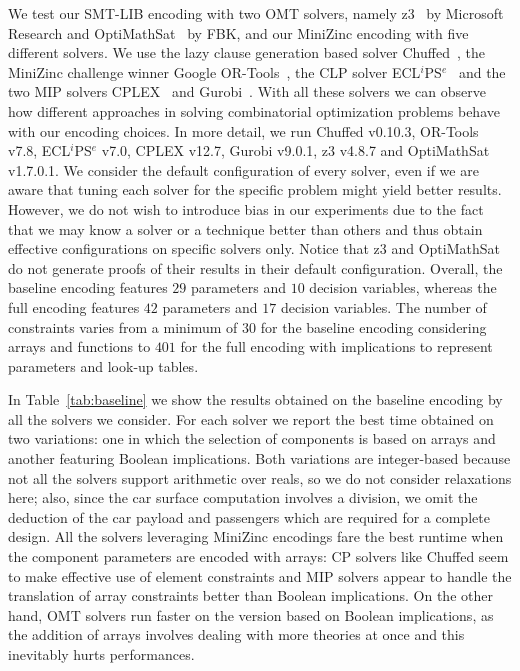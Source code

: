 %
We test our SMT-LIB encoding with two OMT solvers, namely z3~\cite{z3}
by Microsoft Research and OptiMathSat~\cite{sebastiani2018optimathsat}
by FBK, and our MiniZinc encoding with five different solvers. 
We use the lazy clause generation based solver 
Chuffed~\cite{chu2013improving}, the MiniZinc challenge winner Google
OR-Tools~\cite{ortools}, the CLP solver ECL$^i$PS$^e$~\cite{schimpf_shen_2012}
and the two MIP solvers CPLEX~\cite{cplex} and Gurobi~\cite{gurobi}.
With all these solvers we can observe how different approaches in solving
combinatorial optimization problems behave with our encoding 
choices. In more detail, we run Chuffed v0.10.3, OR-Tools v7.8, ECL$^i$PS$^e$ 
v7.0, CPLEX v12.7, Gurobi v9.0.1, z3 v4.8.7 and OptiMathSat v1.7.0.1.
We consider the default configuration of every solver, even 
if we are aware that tuning each solver for the specific problem might
yield better results. However, we do not wish to introduce bias in our
experiments due to the fact that we may know a solver or a technique
better than others and thus obtain effective configurations on
specific solvers only. Notice that z3 and OptiMathSat do not generate 
proofs of their results in their default configuration. Overall, the
baseline encoding features $29$ parameters and $10$ decision variables, 
whereas the full encoding features $42$ parameters and $17$ decision 
variables. The number of constraints varies from a minimum of $30$ for 
the baseline encoding considering arrays and functions to $401$ 
for the full encoding with implications to represent parameters and 
look-up tables. 

In Table~\ref{tab:baseline} we show the results obtained on the
baseline encoding by all the solvers we consider. For each solver we
report the best time obtained on two variations: one in which the
selection of components is based on arrays and another featuring
Boolean implications. Both variations are integer-based because not
all the solvers support arithmetic over reals, so we do not
consider relaxations here; also, since the car surface computation involves
a division, we omit the deduction of the car
payload and passengers which are required for a complete
design. All the solvers leveraging MiniZinc 
encodings  fare the best runtime when the component parameters are
encoded with arrays: CP solvers like Chuffed seem to make effective
use of element constraints and MIP solvers appear to handle the
translation of array constraints better than Boolean implications. On
the other hand, OMT solvers run faster on the version based
on Boolean implications, as the addition of arrays involves dealing
with more theories at once and this inevitably hurts performances.


